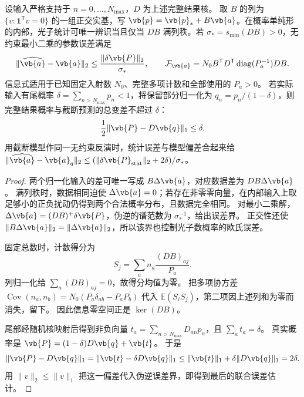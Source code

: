 \begin{proposition}[归一化切空间上的计数核与截断偏差]
\label{prop:feqo-normalized-count-identifiability}
设输入严格支持于 $n=0,\ldots,N_{\max}$，$D$ 为上述完整结果核。
取 $B$ 的列为 $\{v:\mathbf1^{\mathsf T}v=0\}$ 的一组正交实基，写
$\vb{p}=\vb{p}_*+B\vb{a}$。在概率单纯形的内部，光子统计可唯一辨识当且仅当
$DB$ 满列秩。若 $\sigma_* =s_{\min}(DB)>0$，无约束最小二乘的参数误差满足
\begin{equation}
 \|\widehat{\vb{a}}-\vb{a}\|_2
 \le\frac{\|\delta\vb{P}\|_2}{\sigma_*},\qquad
 \mathcal F_{\vb{a}}=N_0 B^{\mathsf T}D^{\mathsf T}
 \operatorname{diag}(P_a^{-1})DB.
 \label{eq:feqo-constrained-kernel-information}
\end{equation}
信息式适用于已知固定入射数 $N_0$、完整多项计数和全部使用的 $P_a>0$。
若实际输入有尾概率 $\delta=\sum_{n>N_{\max}}p_n<1$，将保留部分归一化为
$q_n=p_n/(1-\delta)$，则完整结果概率与截断预测的总变差不超过 $\delta$：
\begin{equation}
 \frac12\|\vb{P}-D\vb{q}\|_1\le\delta.
 \label{eq:feqo-photon-tail-count-bias}
\end{equation}
用截断模型作同一无约束反演时，统计误差与模型偏差合起来给
$\|\widehat{\vb{a}}-\vb{a}_q\|_2
\le(\|\delta\vb{P}_{\rm stat}\|_2+2\delta)/\sigma_*$。
\end{proposition}
\begin{proof}
两个归一化输入的差可唯一写成 $B\Delta\vb{a}$，对应数据差为 $DB\Delta\vb{a}$。
满列秩时，数据相同迫使 $\Delta\vb{a}=0$；若存在非零零向量，在内部输入上取足够小的正负扰动仍得到两个合法概率分布，且数据完全相同。
对最小二乘解，$\Delta\vb{a}=(DB)^+\delta\vb{P}$，伪逆的谱范数为 $\sigma_*^{-1}$，给出误差界。
正交性还使 $\|B\Delta\vb{a}\|_2=\|\Delta\vb{a}\|_2$，所以该界也控制光子数概率的欧氏误差。

固定总数时，计数得分为
\[
 S_j=\sum_a n_a\frac{(DB)_{aj}}{P_a}.
\]
列归一化给 $\sum_a(DB)_{aj}=0$，故得分均值为零。
把多项协方差
$\operatorname{Cov}(n_a,n_b)=N_0(P_a\delta_{ab}-P_aP_b)$
代入 $\mathbb E(S_iS_j)$，第二项因上述列和为零而消失，留下。
因此信息零空间正是 $\ker(DB)$。

尾部经随机核映射后得到非负向量
$t_a=\sum_{n>N_{\max}}D_{an}p_n$，且 $\sum_a t_a=\delta$。
真实概率是 $\vb{P}=(1-\delta)D\vb{q}+\vb{t}$。
于是
\[
 \|\vb{P}-D\vb{q}\|_1
 =\|\vb{t}-\delta D\vb{q}\|_1
 \le\|\vb{t}\|_1+\delta\|D\vb{q}\|_1=2\delta.
\]
用 $\|v\|_2\le\|v\|_1$ 把这一偏差代入伪逆误差界，即得到最后的联合误差估计。
\end{proof}

